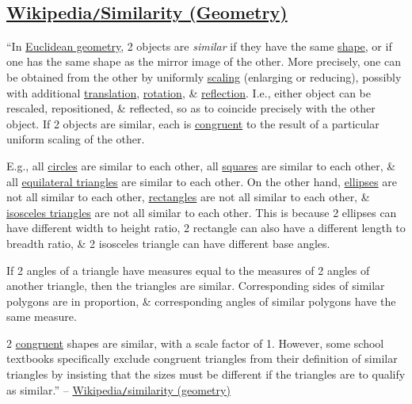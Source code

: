 \documentclass{article}
\begin{document}
\subsection{\href{https://en.wikipedia.org/wiki/Similarity_(geometry)}{Wikipedia\texttt{/}Similarity (Geometry)}}
``In \href{https://en.wikipedia.org/wiki/Euclidean_geometry}{Euclidean geometry}, 2 objects are \textit{similar} if they have the same \href{https://en.wikipedia.org/wiki/Shape}{shape}, or if one has the same shape as the mirror image of the other. More precisely, one can be obtained from the other by uniformly \href{https://en.wikipedia.org/wiki/Scaling_(geometry)}{scaling} (enlarging or reducing), possibly with additional \href{https://en.wikipedia.org/wiki/Translation_(geometry)}{translation}, \href{https://en.wikipedia.org/wiki/Rotation_(mathematics)}{rotation}, \& \href{https://en.wikipedia.org/wiki/Reflection_(mathematics)}{reflection}. I.e., either object can be rescaled, repositioned, \& reflected, so as to coincide precisely with the other object. If 2 objects are similar, each is \href{https://en.wikipedia.org/wiki/Congruence_(geometry)}{congruent} to the result of a particular uniform scaling of the other.

E.g., all \href{https://en.wikipedia.org/wiki/Circle}{circles} are similar to each other, all \href{https://en.wikipedia.org/wiki/Square}{squares} are similar to each other, \& all \href{https://en.wikipedia.org/wiki/Equilateral_triangle}{equilateral triangles} are similar to each other. On the other hand, \href{https://en.wikipedia.org/wiki/Ellipse}{ellipses} are not all similar to each other, \href{https://en.wikipedia.org/wiki/Rectangle}{rectangles} are not all similar to each other, \& \href{https://en.wikipedia.org/wiki/Isosceles_triangle}{isosceles triangles} are not all similar to each other. This is because 2 ellipses can have different width to height ratio, 2 rectangle can also have a different length to breadth ratio, \& 2 isosceles triangle can have different base angles.

If 2 angles of a triangle have measures equal to the measures of 2 angles of another triangle, then the triangles are similar. Corresponding sides of similar polygons are in proportion, \& corresponding angles of similar polygons have the same measure.

2 \href{https://en.wikipedia.org/wiki/Congruence_(geometry)}{congruent} shapes are similar, with a scale factor of 1. However, some school textbooks specifically exclude congruent triangles from their definition of similar triangles by insisting that the sizes must be different if the triangles are to qualify as similar.'' -- \href{https://en.wikipedia.org/wiki/Similarity_(geometry)}{Wikipedia\texttt{/}similarity (geometry)}
\end{document}
